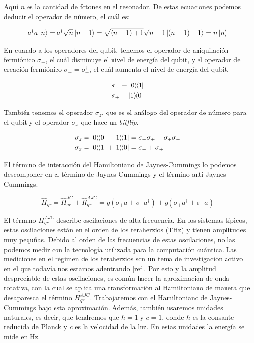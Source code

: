 Aquí $n$ es la cantidad de fotones en el resonador. De estas ecuaciones podemos deducir el operador de número, el cuál es:

\begin{equation}
    a^\dagger a \ket{n} = a^\dagger \sqrt{n} \ket{n-1} = \sqrt{(n-1)+1} \sqrt{n-1} \ket{(n-1)+1} = n \ket{n}
\end{equation}

En cuando a los operadores del qubit, tenemos el operador de aniquilación fermiónico $\sigma_-$, el cuál disminuye el nivel de energía del qubit, y el operador de creación fermiónico $\sigma_+ = \sigma_-^\dagger$, el cuál aumenta el nivel de energía del qubit.

\begin{align}
    \sigma_- &= \ketbra{0}{1} \\
    \sigma_+ &- \ketbra{1}{0}
\end{align}

También tenemos el operador $\sigma_z$, que es el análogo del operador de número para el qubit y el operador $\sigma_x$ que hace un \textit{bitflip}.

\begin{align}
    \sigma_z &= \ketbra{0} - \ketbra{1} = \sigma_-\sigma_+ - \sigma_+\sigma_- \\
    \sigma_x &= \ketbra{0}{1} + \ketbra{1}{0} = \sigma_- + \sigma_+
\end{align}

El término de interacción del Hamiltoniano de Jaynes-Cummings lo podemos descomponer en el término de Jaynes-Cummings y el término anti-Jaynes-Cummings.

\begin{equation}
    \hat{H}_{qr} = \hat{H}_{qr}^{JC} + \hat{H}_{qr}^{AJC} = g(\sigma_+ a + \sigma_- a^\dag) + g(\sigma_+ a^\dag + \sigma_- a)
\end{equation}

El término $H_{qr}^{AJC}$ describe oscilaciones de alta frecuencia. En los sistemas típicos, estas oscilaciones están en el orden de los teraherzios (THz) y tienen amplitudes muy pequñas. Debido al orden de las frecuencias de estas oscilaciones, no las podemos medir con la tecnología utilizada para la computación cuántica. Las mediciones en el régimen de los teraherzios son un tema de investigación activo en el que todavía nos estamos adentrando [ref]. Por esto y la amplitud despreciable de estas oscilaciones, es común hacer la aproximación de onda rotativa, con la cual se aplica una transformación al Hamiltoniano de manera que desaparesca el término $H_{qr}^{AJC}$. Trabajaremos con el Hamiltoniano de Jaynes-Cummings bajo esta aproximación. Además, también usaremos unidades naturales, es decir, que tendremos que $\hbar = 1$ y $c = 1$, donde $\hbar$ es la consante reducida de Planck y $c$ es la velocidad de la luz. En estas unidades la energía se mide en Hz.

